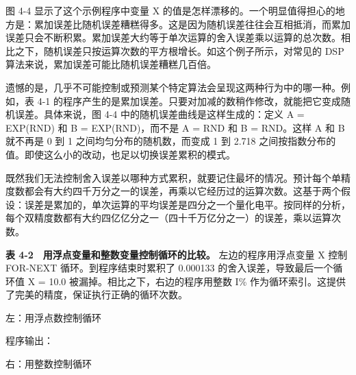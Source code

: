 图 4-4 显示了这个示例程序中变量 X
的值是怎样漂移的。一个明显值得担心的地方是：累加误差比随机误差糟糕得多。这是因为随机误差往往会互相抵消，而累加误差只会不断积累。累加误差大约等于单次运算的舍入误差乘以运算的总次数。相比之下，随机误差只按运算次数的平方根增长。如这个例子所示，对常见的
DSP 算法来说，累加误差可能比随机误差糟糕几百倍。

遗憾的是，几乎不可能控制或预测某个特定算法会呈现这两种行为中的哪一种。例如，表
4-1
的程序产生的是累加误差。只要对加减的数稍作修改，就能把它变成随机误差。具体来说，图
4-4 中的随机误差曲线是这样生成的：定义 A = EXP(RND) 和 B =
EXP(RND)，而不是 A = RND 和 B = RND。这样 A 和 B 就不再是 0 到 1
之间均匀分布的随机数，而变成 1 到 2.718
之间按指数分布的值。即使这么小的改动，也足以切换误差累积的模式。

既然我们无法控制舍入误差以哪种方式累积，就要记住最坏的情况。预计每个单精度数都会有大约四千万分之一的误差，再乘以它经历过的运算次数。这基于两个假设：误差是累加的，单次运算的平均误差是四分之一个量化电平。按同样的分析，每个双精度数都有大约四亿亿分之一（四十千万亿分之一）的误差，乘以运算次数。

\textbf{表 4-2　用浮点变量和整数变量控制循环的比较。}
左边的程序用浮点变量 X 控制 FOR-NEXT 循环。到程序结束时累积了 0.000133
的舍入误差，导致最后一个循环值 X = 10.0
被漏掉。相比之下，右边的程序用整数 I\%
作为循环索引。这提供了完美的精度，保证执行正确的循环次数。

左：用浮点数控制循环

\begin{Shaded}
\begin{Highlighting}[]
\end{Highlighting}
\end{Shaded}

程序输出：

\begin{Shaded}
\begin{Highlighting}[]
\end{Highlighting}
\end{Shaded}

右：用整数控制循环

\begin{Shaded}
\begin{Highlighting}[]
\end{Highlighting}
\end{Shaded}


